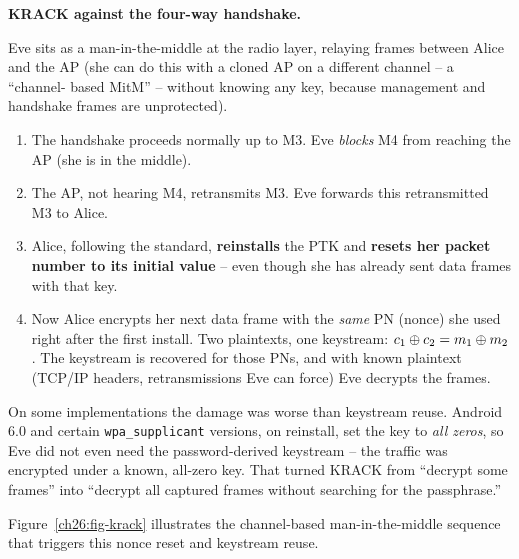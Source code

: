 \begin{attackbox}
\textbf{KRACK against the four-way handshake.}

Eve sits as a man-in-the-middle at the radio layer, relaying frames between Alice
and the AP (she can do this with a cloned AP on a different channel -- a ``channel-
based MitM'' -- without knowing any key, because management and handshake frames
are unprotected).

\begin{enumerate}
  \item The handshake proceeds normally up to M3. Eve \emph{blocks} M4 from
        reaching the AP (she is in the middle).
  \item The AP, not hearing M4, retransmits M3. Eve forwards this retransmitted M3
        to Alice.
  \item Alice, following the standard, \textbf{reinstalls} the PTK and \textbf{
        resets her packet number to its initial value} -- even though she has
        already sent data frames with that key.
  \item Now Alice encrypts her next data frame with the \emph{same} PN (nonce) she
        used right after the first install. Two plaintexts, one keystream:
        $c_1 \oplus c_2 = m_1 \oplus m_2$. The keystream is recovered for those PNs,
        and with known plaintext (TCP/IP headers, retransmissions Eve can force)
        Eve decrypts the frames.
\end{enumerate}

On some implementations the damage was worse than keystream reuse. Android $6.0$
and certain \texttt{wpa\_supplicant} versions, on reinstall, set the key to
\emph{all zeros}, so Eve did not even need the password-derived keystream -- the
traffic was encrypted under a known, all-zero key. That turned KRACK from
``decrypt some frames'' into ``decrypt all captured frames without searching for the passphrase.''
\end{attackbox}

Figure~\ref{ch26:fig-krack} illustrates the channel-based man-in-the-middle sequence that triggers
this nonce reset and keystream reuse.


